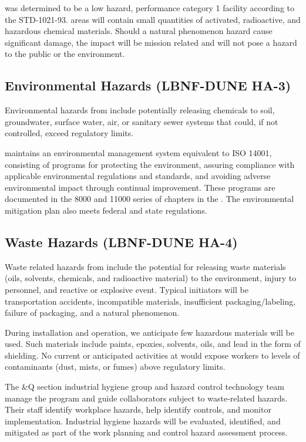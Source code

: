  was determined to be a low hazard,
performance category 1 facility according to the 
STD-1021-93.  areas will contain small
quantities of activated, radioactive, and hazardous chemical
materials. Should a natural phenomenon hazard cause significant
damage, the impact will be mission related and will not pose a hazard
to the public or the environment.

\subsection{Environmental Hazards (LBNF-DUNE HA-3)}

Environmental hazards from  include potentially releasing
chemicals to soil, groundwater, surface water, air, or sanitary sewer
systems that could, if not controlled, exceed regulatory limits.

\fnal maintains an environmental management system equivalent to ISO
14001, consisting of programs for protecting the environment, assuring
compliance with applicable environmental regulations and standards,
and avoiding adverse environmental impact through continual
improvement.  These programs are documented in the 8000 and 11000
series of chapters in the .  The environmental mitigation
plan also meets federal and state regulations.


\subsection{Waste Hazards (LBNF-DUNE HA-4)}

Waste related hazards from  include the potential for
releasing waste materials (oils, solvents, chemicals, and radioactive
material) to the environment, injury to personnel, and reactive or
explosive event. Typical initiators will be transportation accidents,
incompatible materials, insufficient packaging/labeling, failure of
packaging, and a natural phenomenon.

During installation and  operation, we anticipate few
hazardous materials will be used. Such materials include paints,
epoxies, solvents, oils, and lead in the form of shielding. No current
or anticipated activities at  would expose workers to
levels of contaminants (dust, mists, or fumes) above regulatory
limits.

The \&Q section industrial hygiene group and hazard control
technology team manage the program and guide collaborators subject to
waste-related hazards.  Their staff identify workplace hazards, help
identify controls, and monitor implementation. Industrial hygiene
hazards will be evaluated, identified, and mitigated as part of the
work planning and control hazard assessment process.

